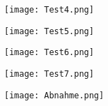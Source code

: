 \begin{figure}[H]
	\centering
	\texttt{[image: Test4.png]}
	\label{fig:Test4}
\end{figure}

\begin{figure}[H]
	\centering
	\texttt{[image: Test5.png]}
	\label{fig:Test5}
\end{figure}

\begin{figure}[H]
	\centering
	\texttt{[image: Test6.png]}
	\label{fig:Test6}
\end{figure}

\begin{figure}[H]
	\centering
	\texttt{[image: Test7.png]}
	\label{fig:Test7}
\end{figure}

\begin{figure}[H]
	\centering
	\texttt{[image: Abnahme.png]}
	\label{fig:Protokoll}
\end{figure}